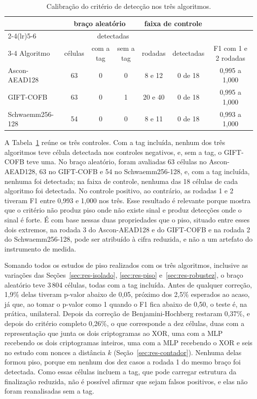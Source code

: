 \begin{table}[htb]
\centering
\caption{Calibração do critério de detecção nos três algoritmos.}
\label{tab:res-calibracao}
\small
\setlength{\tabcolsep}{2.5pt}
\begin{tabular}{lcccccc}
\toprule
 & \multicolumn{3}{c}{braço aleatório} & \multicolumn{2}{c}{faixa de controle} & \\
\cmidrule(lr){2-4}\cmidrule(lr){5-6}
 & & \multicolumn{2}{c}{detectadas} & & & \\
\cmidrule(lr){3-4}
Algoritmo & células & com a tag & sem a tag & rodadas & detectadas & F1 com 1 e 2 rodadas \\
\midrule
Ascon-AEAD128   & 63 & 0 & 0 & 8 e 12  & 0 de 18 & 0,995 a 1,000 \\
GIFT-COFB       & 63 & 0 & 1 & 20 e 40 & 0 de 18 & 0,995 a 1,000 \\
Schwaemm256-128 & 54 & 0 & 0 & 8 e 11  & 0 de 18 & 0,993 a 1,000 \\
\bottomrule
\end{tabular}
\end{table}

A Tabela~\ref{tab:res-calibracao} reúne os três controles. Com a tag incluída, nenhum dos três algoritmos teve célula detectada nos controles negativos, e, sem a tag, o GIFT-COFB teve uma. No braço aleatório, foram avaliadas 63 células no Ascon-AEAD128, 63 no GIFT-COFB e 54 no Schwaemm256-128, e, com a tag incluída, nenhuma foi detectada; na faixa de controle, nenhuma das 18 células de cada algoritmo foi detectada. No controle positivo, ao contrário, as rodadas 1 e 2 tiveram F1 entre 0,993 e 1,000 nos três. Esse resultado é relevante porque mostra que o critério não produz piso onde não existe sinal e produz detecções onde o sinal é forte. É com base nessas duas propriedades que o piso, situado entre esses dois extremos, na rodada 3 do Ascon-AEAD128 e do GIFT-COFB e na rodada 2 do Schwaemm256-128, pode ser atribuído à cifra reduzida, e não a um artefato do instrumento de medida.

Somando todos os estudos de piso realizados com os três algoritmos, inclusive as variações das Seções~\ref{sec:res-isolado}, \ref{sec:res-piso} e~\ref{sec:res-robustez}, o braço aleatório teve 3\,804 células, todas com a tag incluída. Antes de qualquer correção, 1,9\% delas tiveram p-valor abaixo de 0,05, próximo dos 2,5\% esperados ao acaso, já que, ao tomar o p-valor como 1 quando o F1 fica abaixo de 0,50, o teste é, na prática, unilateral. Depois da correção de Benjamini-Hochberg restaram 0,37\%, e depois do critério completo 0,26\%, o que corresponde a dez células, duas com a representação que junta os dois criptogramas ao XOR, uma com a MLP recebendo os dois criptogramas inteiros, uma com a MLP recebendo o XOR e seis no estudo com nonces a distância $k$ (Seção~\ref{sec:res-contador}). Nenhuma delas formou piso, porque em nenhum dos dez casos a rodada 1 do mesmo braço foi detectada. Como essas células incluem a tag, que pode carregar estrutura da finalização reduzida, não é possível afirmar que sejam falsos positivos, e elas não foram reanalisadas sem a tag.

